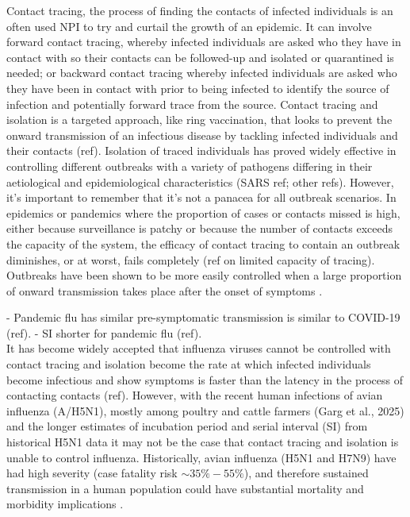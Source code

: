 \documentclass{article}
\begin{document}
Contact tracing, the process of finding the contacts of infected individuals is an often used NPI to try and curtail the growth of an epidemic. It can involve forward contact tracing, whereby infected individuals are asked who they have in contact with so their contacts can be followed-up and isolated or quarantined is needed; or backward contact tracing whereby infected individuals are asked who they have been in contact with prior to being infected to identify the source of infection and potentially forward trace from the source. Contact tracing and isolation is a targeted approach, like ring vaccination, that looks to prevent the onward transmission of an infectious disease by tackling infected individuals and their contacts \citep{kucharskiEffectivenessRingVaccination2016} (ref). Isolation of traced individuals has proved widely effective in controlling different outbreaks with a variety of pathogens differing in their aetiological and epidemiological characteristics (SARS ref; other refs). However, it's important to remember that it's not a panacea for all outbreak scenarios. In epidemics or pandemics where the proportion of cases or contacts missed is high, either because surveillance is patchy or because the number of contacts exceeds the capacity of the system, the efficacy of contact tracing to contain an outbreak diminishes, or at worst, fails completely \citep{dhillonWhenContactTracing2018} (ref on limited capacity of tracing). \\

Outbreaks have been shown to be more easily controlled when a large proportion of onward transmission takes place after the onset of symptoms \citep{fraserFactorsThatMake2004}.

- Pandemic flu has similar pre-symptomatic transmission is similar to COVID-19 (ref).
- SI shorter for pandemic flu (ref). \\

It has become widely accepted that influenza viruses cannot be controlled with contact tracing and isolation become the rate at which infected individuals become infectious and show symptoms is faster than the latency in the process of contacting contacts (ref). However, with the recent human infections of avian influenza (A/H5N1), mostly among poultry and cattle farmers (Garg et al., 2025) and the longer estimates of incubation period and serial interval (SI) from historical H5N1 data \citep{Ward2024.12.11.24318702} it may not be the case that contact tracing and isolation is unable to control influenza. Historically, avian influenza (H5N1 and H7N9) have had high severity (case fatality risk $\sim 35\%-55\%$), and therefore sustained transmission in a human population could have substantial mortality and morbidity implications \citep{tannerPandemicPotentialAvian2015}. \\
\end{document}
